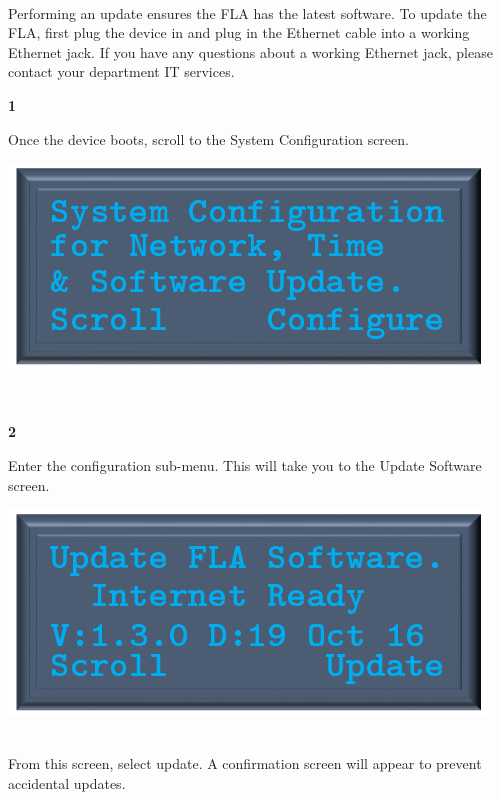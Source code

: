 \documentclass[11pt, oneside]{book}
\begin{document}
\paragraph{  }
Performing an update ensures the FLA has the latest software. To update the FLA, first plug the device in and plug in the Ethernet cable into a working Ethernet jack. If you have any questions about a working Ethernet jack, please contact your department IT services.
\\[\baselineskip]
\noindent\begin{minipage}{0.45\textwidth}%
\begin{center}
\textbf{1}\\[\baselineskip]
\end{center}
Once the device boots, scroll to the System Configuration screen.
\end{minipage}%
\hfill%
\begin{minipage}{0.45\textwidth}
\includegraphics[width=\linewidth]{../media/pstricks_files/06_system_configuration}
\end{minipage}
\\[\baselineskip]
\noindent\begin{minipage}{0.45\textwidth}%
\begin{center}
\textbf{2}\\[\baselineskip]
\end{center}
Enter the configuration sub-menu. This will take you to the Update Software screen.
\end{minipage}%
\hfill%
\begin{minipage}{0.45\textwidth}
\includegraphics[width=\linewidth]{../media/pstricks_files/07_update_fla_software}
\end{minipage}
\\[\baselineskip]
From this screen, select update. A confirmation screen will appear to prevent accidental updates.\newline
\end{document}
